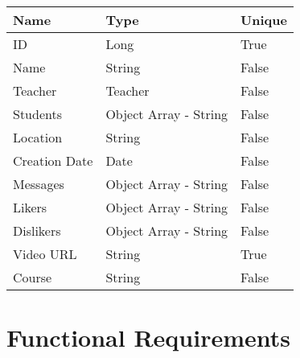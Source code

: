 \documentclass[12pt,a4paper]{article}
\begin{document}
    \begin{table}[h]
        \centering
        \begin{tabular}{|l|l|l|}
            \hline
            \textbf{Name} & \textbf{Type} & \textbf{Unique} \\
            \hline
            ID & Long & True \\
            \hline
            Name & String & False \\
            \hline
            Teacher & Teacher & False \\
            \hline
            Students & Object Array - String & False \\
            \hline
            Location & String & False \\
            \hline
            Creation Date & Date & False \\
            \hline
            Messages & Object Array - String & False \\
            \hline
            Likers & Object Array - String & False \\
            \hline
            Dislikers & Object Array - String & False \\
            \hline
            Video URL & String & True \\
            \hline
            Course & String & False \\
            \hline
        \end{tabular}
    \end{table}


    \newpage




    \section{Functional Requirements}
\end{document}
